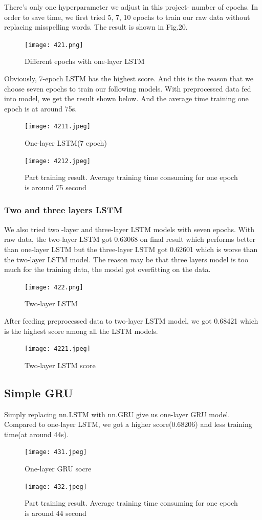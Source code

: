 \documentclass{article}
\begin{document}
\noindent There’s only one hyperparameter we adjust in this project- number of epochs. In order to save time, we first tried 5, 7, 10 epochs to train our raw data without replacing misspelling words. The result is shown in Fig.20.\\
\begin{figure}[H]
	\centering
	\texttt{[image: 421.png]}
	\caption{Different epochs with one-layer LSTM}
\end{figure}
\noindent Obviously, 7-epoch LSTM has the highest score. And this is the reason that we choose seven epochs to train our following models.
With preprocessed data fed into model, we get the result shown below. And the average time training one epoch is at around 75s.
\begin{figure}[H]
	\centering
	\texttt{[image: 4211.jpeg]}
	\caption{One-layer LSTM(7 epoch)
	}
\end{figure}
\begin{figure}[H]
	\centering
	\texttt{[image: 4212.jpeg]}
	\caption{Part training result. Average training time consuming for one epoch is around 75 second
	}
\end{figure}
\subsubsection{ Two and three layers LSTM}
\noindent We also tried two -layer and three-layer LSTM models with seven epochs. With raw data, the two-layer LSTM got 0.63068 on final result which performs better than one-layer LSTM but the three-layer LSTM got 0.62601 which is worse than the two-layer LSTM model. The reason may be that three layers model is too much for the training data, the model got overfitting on the data.\\
\begin{figure}[H]
	\centering
	\texttt{[image: 422.png]}
	\caption{Two-layer LSTM}
\end{figure}
\noindent After feeding preprocessed data to two-layer LSTM model, we got 0.68421 which is the highest score among all the LSTM models.\\
	\begin{figure}[H]
		\centering
		\texttt{[image: 4221.jpeg]}
		\caption{ Two-layer LSTM score }
	\end{figure}
\subsection{Simple GRU}
\noindent Simply replacing nn.LSTM with nn.GRU give us one-layer GRU model. Compared to one-layer LSTM, we got a higher score(0.68206) and less training time(at around 44s).\\
	\begin{figure}[H]
	\centering
	\texttt{[image: 431.jpeg]}
	\caption{ One-layer GRU socre}
\end{figure}
\begin{figure}[H]
	\centering
	\texttt{[image: 432.jpeg]}
	\caption{Part training result. Average training time consuming for one epoch is around 44 second}
\end{figure}
	
\end{document}
